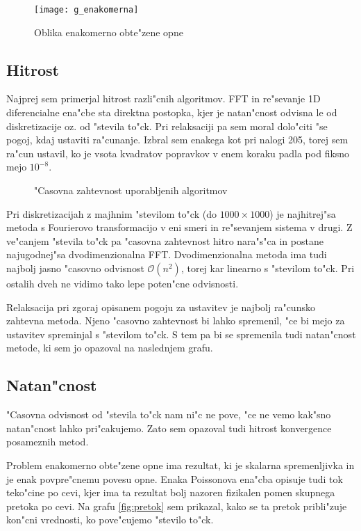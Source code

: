 \documentclass[a4paper,10pt]{article}
\begin{document}
\begin{figure}[H]
\centering
 \texttt{[image: g\_enakomerna]}
 \caption{Oblika enakomerno obte"zene opne}
 \label{fig:enakomerna}
\end{figure}

\subsection{Hitrost}

Najprej sem primerjal hitrost razli"cnih algoritmov. FFT in re"sevanje 1D diferencialne ena"cbe sta direktna postopka, kjer je natan"cnost odvisna le od diskretizacije oz. od "stevila to"ck. Pri relaksaciji pa sem moral dolo"citi "se pogoj, kdaj ustaviti ra"cunanje. Izbral sem enakega kot pri nalogi 205, torej sem ra"cun ustavil, ko je vsota kvadratov popravkov v enem koraku padla pod fiksno mejo $10^{-8}$. 

\begin{figure}[H]

\caption{"Casovna zahtevnost uporabljenih algoritmov}
\label{fig:hitrost}  
\end{figure}

Pri diskretizacijah z majhnim "stevilom to"ck (do $1000 \times 1000$) je najhitrej"sa metoda s Fourierovo transformacijo v eni smeri in re"sevanjem sistema v drugi. Z ve"canjem "stevila to"ck pa "casovna zahtevnost hitro nara"s"ca in postane najugodnej"sa dvodimenzionalna FFT. Dvodimenzionalna metoda ima tudi najbolj jasno "casovno odvisnost $\mathcal{O}(n^2)$, torej kar linearno s "stevilom to"ck. Pri ostalih dveh ne vidimo tako lepe poten"cne odvisnosti. 

Relaksacija pri zgoraj opisanem pogoju za ustavitev je najbolj ra"cunsko zahtevna metoda. Njeno "casovno zahtevnost bi lahko spremenil, "ce bi mejo za ustavitev spreminjal s "stevilom to"ck. S tem pa bi se spremenila tudi natan"cnost metode, ki sem jo opazoval na naslednjem grafu. 

\subsection{Natan"cnost}

"Casovna odvisnost od "stevila to"ck nam ni"c ne pove, "ce ne vemo kak"sno natan"cnost lahko pri"cakujemo. Zato sem opazoval tudi hitrost konvergence posameznih metod. 

Problem enakomerno obte"zene opne ima rezultat, ki je skalarna spremenljivka in je enak povpre"cnemu povesu opne. Enaka Poissonova ena"cba opisuje tudi tok teko"cine po cevi, kjer ima ta rezultat bolj nazoren fizikalen pomen skupnega pretoka po cevi. Na grafu \ref{fig:pretok} sem prikazal, kako se ta pretok pribli"zuje kon"cni vrednosti, ko pove"cujemo "stevilo to"ck. 
\end{document}
